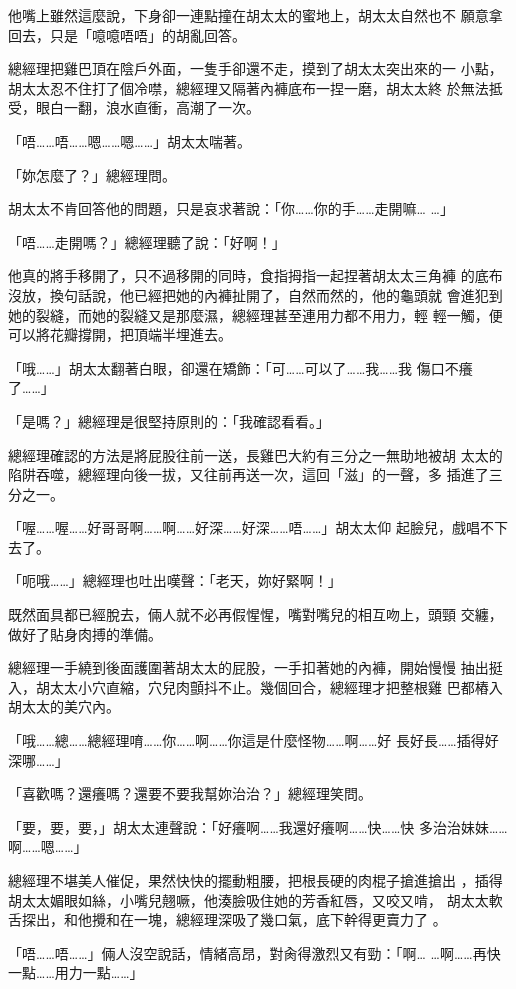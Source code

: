他嘴上雖然這麼說，下身卻一連點撞在胡太太的蜜地上，胡太太自然也不
願意拿回去，只是「噫噫唔唔」的胡亂回答。

總經理把雞巴頂在陰戶外面，一隻手卻還不走，摸到了胡太太突出來的一
小點，胡太太忍不住打了個冷噤，總經理又隔著內褲底布一捏一磨，胡太太終
於無法抵受，眼白一翻，浪水直衝，高潮了一次。

「唔……唔……嗯……嗯……」胡太太喘著。

「妳怎麼了？」總經理問。

胡太太不肯回答他的問題，只是哀求著說：「你……你的手……走開嘛…
…」

「唔……走開嗎？」總經理聽了說：「好啊！」

他真的將手移開了，只不過移開的同時，食指拇指一起捏著胡太太三角褲
的底布沒放，換句話說，他已經把她的內褲扯開了，自然而然的，他的龜頭就
會進犯到她的裂縫，而她的裂縫又是那麼濕，總經理甚至連用力都不用力，輕
輕一觸，便可以將花瓣撐開，把頂端半埋進去。

「哦……」胡太太翻著白眼，卻還在矯飾：「可……可以了……我……我
傷口不癢了……」

「是嗎？」總經理是很堅持原則的：「我確認看看。」

總經理確認的方法是將屁股往前一送，長雞巴大約有三分之一無助地被胡
太太的陷阱吞噬，總經理向後一拔，又往前再送一次，這回「滋」的一聲，多
插進了三分之一。

「喔……喔……好哥哥啊……啊……好深……好深……唔……」胡太太仰
起臉兒，戲唱不下去了。

「呃哦……」總經理也吐出嘆聲：「老天，妳好緊啊！」

既然面具都已經脫去，倆人就不必再假惺惺，嘴對嘴兒的相互吻上，頭頸
交纏，做好了貼身肉搏的準備。

總經理一手繞到後面護圍著胡太太的屁股，一手扣著她的內褲，開始慢慢
抽出挺入，胡太太小穴直縮，穴兒肉顫抖不止。幾個回合，總經理才把整根雞
巴都樁入胡太太的美穴內。

「哦……總……總經理唷……你……啊……你這是什麼怪物……啊……好
長好長……插得好深哪……」

「喜歡嗎？還癢嗎？還要不要我幫妳治治？」總經理笑問。

「要，要，要，」胡太太連聲說：「好癢啊……我還好癢啊……快……快
多治治妹妹……啊……嗯……」

總經理不堪美人催促，果然快快的擺動粗腰，把根長硬的肉棍子搶進搶出
，插得胡太太媚眼如絲，小嘴兒翹噘，他湊臉吸住她的芳香紅唇，又咬又啃，
胡太太軟舌探出，和他攪和在一塊，總經理深吸了幾口氣，底下幹得更賣力了
。

「唔……唔……」倆人沒空說話，情緒高昂，對肏得激烈又有勁：「啊…
…啊……再快一點……用力一點……」

